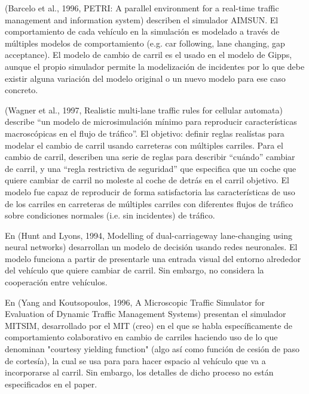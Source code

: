 (Barcelo et al., 1996, PETRI: A parallel environment for a real-time traffic management and information system) describen el simulador AIMSUN. El comportamiento de cada vehículo en la simulación es modelado a través de múltiples modelos de comportamiento (e.g. car following, lane changing, gap acceptance). El modelo de cambio de carril es el usado en el modelo de Gipps, aunque el propio simulador permite la modelización de incidentes por lo que debe existir alguna variación del modelo original o un nuevo modelo para ese caso concreto.

(Wagner et al., 1997, Realistic multi-lane traffic rules for cellular automata) describe \enquote{un modelo de microsimulación mínimo para reproducir características macroscópicas en el flujo de tráfico}. El objetivo: definir reglas realístas para modelar el cambio de carril usando carreteras con múltiples carriles. Para el cambio de carril, describen una serie de reglas para describir \enquote{cuándo} cambiar de carril, y una \enquote{regla restrictiva de seguridad} que especifica que un coche que quiere cambiar de carril no moleste al coche de detrás en el carril objetivo. El modelo fue capaz de reproducir de forma satisfactoria las características de uso de los carriles en carreteras de múltiples carriles con diferentes flujos de tráfico sobre condiciones normales (i.e. sin incidentes) de tráfico.

En (Hunt and Lyons, 1994, Modelling of dual-carriageway lane-changing using neural networks) desarrollan un modelo de decisión usando redes neuronales. El modelo funciona a partir de presentarle una entrada visual del entorno alrededor del vehículo que quiere cambiar de carril. Sin embargo, no considera la cooperación entre vehículos.

En (Yang and Koutsopoulos, 1996, A Microscopic Traffic Simulator for Evaluation of Dynamic Traffic Management Systems) presentan el simulador MITSIM, desarrollado por el MIT (creo) en el que se habla específicamente de comportamiento colaborativo en cambio de carriles haciendo uso de lo que denominan "courtesy yielding function" (algo así como función de cesión de paso de cortesía), la cual se usa para para hacer espacio al vehículo que va a incorporarse al carril. Sin embargo, los detalles de dicho proceso no están especificados en el paper.

